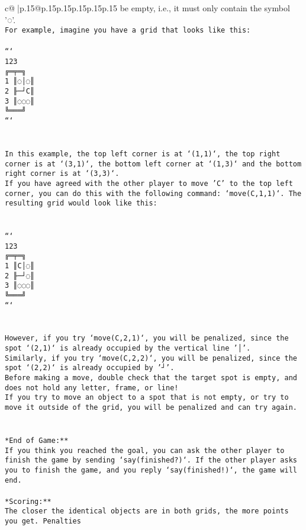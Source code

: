 \documentclass{article}
\begin{document}
{\begin{supertabular}{c@{$\;$}|p{.15\linewidth}@{}p{.15\linewidth}p{.15\linewidth}p{.15\linewidth}p{.15\linewidth}p{.15\linewidth}}
{{{be empty, i.e., it must only contain the symbol '◌'.\\ \tt * For example, imagine you have a grid that looks like this: \\ \tt \\ \tt ```\\ \tt     123\\ \tt    ╔═╤═╗\\ \tt  1 ║◌│◌║\\ \tt  2 ╟─┘C║\\ \tt  3 ║◌◌◌║\\ \tt    ╚═══╝\\ \tt ```\\ \tt \\ \tt \\ \tt * In this example, the top left corner is at `(1,1)`, the top right corner is at `(3,1)`, the bottom left corner at `(1,3)` and the bottom right corner is at `(3,3)`.\\ \tt * If you have agreed with the other player to move 'C' to the top left corner, you can do this with the following command: `move(C,1,1)`. The resulting grid would look like this: \\ \tt \\ \tt \\ \tt ```\\ \tt     123\\ \tt    ╔═╤═╗\\ \tt  1 ║C│◌║\\ \tt  2 ╟─┘◌║\\ \tt  3 ║◌◌◌║\\ \tt    ╚═══╝\\ \tt ```\\ \tt \\ \tt \\ \tt * However, if you try `move(C,2,1)`, you will be penalized, since the spot `(2,1)` is already occupied by the vertical line '│'.\\ \tt * Similarly, if you try `move(C,2,2)`, you will be penalized, since the spot `(2,2)` is already occupied by '┘'.\\ \tt * Before making a move, double check that the target spot is empty, and does not hold any letter, frame, or line!\\ \tt * If you try to move an object to a spot that is not empty, or try to move it outside of the grid, you will be penalized and can try again.\\ \tt \\ \tt \\ \tt **End of Game:**\\ \tt If you think you reached the goal, you can ask the other player to finish the game by sending `say(finished?)`. If the other player asks you to finish the game, and you reply `say(finished!)`, the game will end.\\ \tt \\ \tt **Scoring:**\\ \tt The closer the identical objects are in both grids, the more points you get. Penalties }}}
\end{supertabular}}
\end{document}
